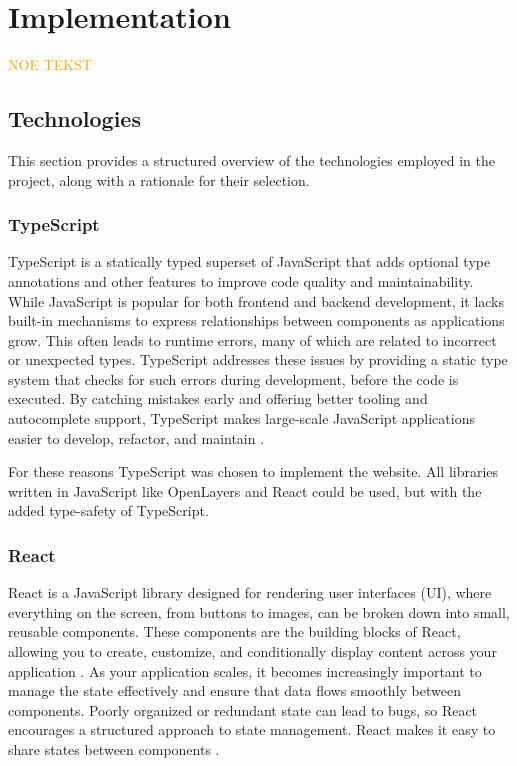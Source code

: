 \chapter{Implementation}

\textcolor{orange}{NOE TEKST}

\section{Technologies}

This section provides a structured overview of the technologies employed in the project, along with a rationale for their selection.

\subsection{TypeScript}

TypeScript is a statically typed superset of JavaScript that adds optional type annotations and other features to improve code quality and maintainability. While JavaScript is popular for both frontend and backend development, it lacks built-in mechanisms to express relationships between components as applications grow. This often leads to runtime errors, many of which are related to incorrect or unexpected types. TypeScript addresses these issues by providing a static type system that checks for such errors during development, before the code is executed. By catching mistakes early and offering better tooling and autocomplete support, TypeScript makes large-scale JavaScript applications easier to develop, refactor, and maintain \cite{typescript_handbook}. 

For these reasons TypeScript was chosen to implement the website. All libraries written in JavaScript like OpenLayers and React could be used, but with the added type-safety of TypeScript.

\subsection{React}

React is a JavaScript library designed for rendering user interfaces (UI), where everything on the screen, from buttons to images, can be broken down into small, reusable components. These components are the building blocks of React, allowing you to create, customize, and conditionally display content across your application \cite{react_component}. As your application scales, it becomes increasingly important to manage the state effectively and ensure that data flows smoothly between components. Poorly organized or redundant state can lead to bugs, so React encourages a structured approach to state management. React makes it easy to share states between components \cite{react_state}. 

